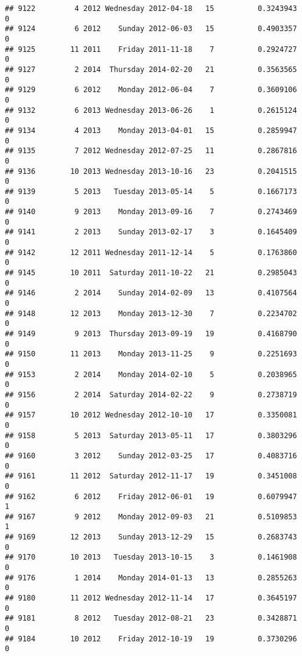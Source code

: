 \documentclass[
]{article}
\begin{document}
\begin{verbatim}
## 9122         4 2012 Wednesday 2012-04-18   15          0.3243943             0
## 9124         6 2012    Sunday 2012-06-03   15          0.4903357             0
## 9125        11 2011    Friday 2011-11-18    7          0.2924727             0
## 9127         2 2014  Thursday 2014-02-20   21          0.3563565             0
## 9129         6 2012    Monday 2012-06-04    7          0.3609106             0
## 9132         6 2013 Wednesday 2013-06-26    1          0.2615124             0
## 9134         4 2013    Monday 2013-04-01   15          0.2859947             0
## 9135         7 2012 Wednesday 2012-07-25   11          0.2867816             0
## 9136        10 2013 Wednesday 2013-10-16   23          0.2041515             0
## 9139         5 2013   Tuesday 2013-05-14    5          0.1667173             0
## 9140         9 2013    Monday 2013-09-16    7          0.2743469             0
## 9141         2 2013    Sunday 2013-02-17    3          0.1645409             0
## 9142        12 2011 Wednesday 2011-12-14    5          0.1763860             0
## 9145        10 2011  Saturday 2011-10-22   21          0.2985043             0
## 9146         2 2014    Sunday 2014-02-09   13          0.4107564             0
## 9148        12 2013    Monday 2013-12-30    7          0.2234702             0
## 9149         9 2013  Thursday 2013-09-19   19          0.4168790             0
## 9150        11 2013    Monday 2013-11-25    9          0.2251693             0
## 9153         2 2014    Monday 2014-02-10    5          0.2038965             0
## 9156         2 2014  Saturday 2014-02-22    9          0.2738719             0
## 9157        10 2012 Wednesday 2012-10-10   17          0.3350081             0
## 9158         5 2013  Saturday 2013-05-11   17          0.3803296             0
## 9160         3 2012    Sunday 2012-03-25   17          0.4083716             0
## 9161        11 2012  Saturday 2012-11-17   19          0.3451008             0
## 9162         6 2012    Friday 2012-06-01   19          0.6079947             1
## 9167         9 2012    Monday 2012-09-03   21          0.5109853             1
## 9169        12 2013    Sunday 2013-12-29   15          0.2683743             0
## 9170        10 2013   Tuesday 2013-10-15    3          0.1461908             0
## 9176         1 2014    Monday 2014-01-13   13          0.2855263             0
## 9180        11 2012 Wednesday 2012-11-14   17          0.3645197             0
## 9181         8 2012   Tuesday 2012-08-21   23          0.3428871             0
## 9184        10 2012    Friday 2012-10-19   19          0.3730296             0

\end{verbatim}
\end{document}
